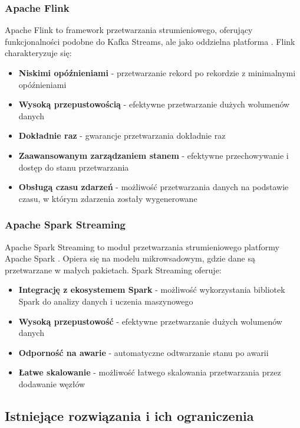 \subsubsection{Apache Flink}
\label{subsubsec:apache_flink}

Apache Flink to framework przetwarzania strumieniowego, oferujący funkcjonalności podobne do Kafka Streams, ale jako oddzielna platforma \citep{flink}. Flink charakteryzuje się:

\begin{itemize}
    \item \textbf{Niskimi opóźnieniami} - przetwarzanie rekord po rekordzie z minimalnymi opóźnieniami
    \item \textbf{Wysoką przepustowością} - efektywne przetwarzanie dużych wolumenów danych
    \item \textbf{Dokładnie raz} - gwarancje przetwarzania dokładnie raz
    \item \textbf{Zaawansowanym zarządzaniem stanem} - efektywne przechowywanie i dostęp do stanu przetwarzania
    \item \textbf{Obsługą czasu zdarzeń} - możliwość przetwarzania danych na podstawie czasu, w którym zdarzenia zostały wygenerowane
\end{itemize}

\subsubsection{Apache Spark Streaming}
\label{subsubsec:spark_streaming}

Apache Spark Streaming to moduł przetwarzania strumieniowego platformy Apache Spark \citep{spark_streaming}. Opiera się na modelu mikrowsadowym, gdzie dane są przetwarzane w małych pakietach. Spark Streaming oferuje:

\begin{itemize}
    \item \textbf{Integrację z ekosystemem Spark} - możliwość wykorzystania bibliotek Spark do analizy danych i uczenia maszynowego
    \item \textbf{Wysoką przepustowość} - efektywne przetwarzanie dużych wolumenów danych
    \item \textbf{Odporność na awarie} - automatyczne odtwarzanie stanu po awarii
    \item \textbf{Łatwe skalowanie} - możliwość łatwego skalowania przetwarzania przez dodawanie węzłów
\end{itemize}

\subsection{Istniejące rozwiązania i ich ograniczenia}
\label{subsec:istniejace_rozwiazania}

